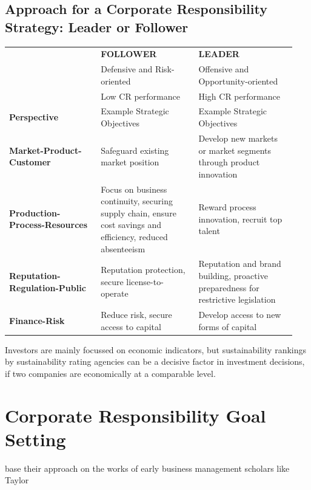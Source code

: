 \documentclass[11pt]{article}
\theoremstyle{definition}
\begin{document}
\subsection{Approach for a Corporate Responsibility Strategy: Leader or Follower}
\begin{tabularx}{\linewidth}{>{\raggedright}p{0.3\linewidth} >{\raggedright}p{0.32\linewidth} >{\raggedleft\arraybackslash}p{0.32\linewidth}}
	& \cellcolor{SteelBlue1!75} \textbf{FOLLOWER} & \cellcolor{SteelBlue1!75} \textbf{LEADER}\\
	& \cellcolor{SteelBlue1!75} Defensive and Risk-oriented & \cellcolor{SteelBlue1!75} Offensive and Opportunity-oriented\\
	& \cellcolor{SteelBlue1!75} Low CR performance & \cellcolor{SteelBlue1!75} High CR performance\\[1em]
	\cellcolor{DodgerBlue1!25} \textbf{Perspective} & \cellcolor{DodgerBlue1!25} Example Strategic Objectives & \cellcolor{DodgerBlue1!25} Example Strategic Objectives\\[1em]
	\cellcolor{DodgerBlue1!25} \textbf{Market-Product-Customer} & Safeguard existing market position & Develop new markets or market segments through product innovation\\[1em]
	\cellcolor{DodgerBlue1!25} \textbf{Production-Process-Resources} & Focus on business continuity, securing supply chain, ensure cost savings and efficiency, reduced absenteeism & Reward process innovation, recruit top talent\\[1em]
	\cellcolor{DodgerBlue1!25} \textbf{Reputation-Regulation-Public} & Reputation protection, secure license-to-operate & Reputation and brand building, proactive preparedness for restrictive legislation\\[1em]
	\cellcolor{DodgerBlue1!25} \textbf{Finance-Risk} & Reduce risk, secure access to capital & Develop access to new forms of capital\\[1em]
\end{tabularx}
Investors are mainly focussed on economic indicators, but sustainability rankings by sustainability rating agencies can be a decisive factor in investment decisions, if two companies are economically at a comparable level.

\section{Corporate Responsibility Goal Setting}
\citeauthor{stead2008sustainable} base their approach on the works of early business management scholars like Taylor 
\end{document}
